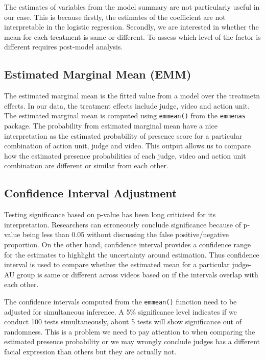 \documentclass{monashthesis}
\begin{document}
The estimates of variables from the model summary are not particularly useful in our case. This is because firstly, the estimates of the coefficient are not interpretable in the logistic regression. Secondly, we are interested in whether the mean for each treatment is same or different. To assess which level of the factor is different requires post-model analysis.

\hypertarget{estimated-marginal-mean-emm}{%
\subsection{Estimated Marginal Mean (EMM)}\label{estimated-marginal-mean-emm}}

The estimated marginal mean \autocite{gelman2006data} is the fitted value from a model over the treatmetn effects. In our data, the treatment effects include judge, video and action unit. The estimated marginal mean is computed using \texttt{emmean()} from the \texttt{emmenas} package. The probability from estimated marginal mean have a nice interpretation as the estimated probability of presence score for a particular combination of action unit, judge and video. This output allows us to compare how the estimated presence probabilities of each judge, video and action unit combination are different or similar from each other.

\hypertarget{confidence-interval-adjustment}{%
\subsection{Confidence Interval Adjustment}\label{confidence-interval-adjustment}}

Testing significance based on p-value has been long criticised for its interpretation. Researchers can erroneously conclude significance because of p-value being less than 0.05 without discussing the false positive/negative proportion. On the other hand, confidence interval provides a confidence range for the estimates to highlight the uncertainty around estimation. Thus confidence interval is used to compare whether the estimated mean for a particular judge-AU group is same or different across videos based on if the intervals overlap with each other.

The confidence intervals computed from the \texttt{emmean()} function need to be adjusted for simultaneous inference. A 5\% significance level indicates if we conduct 100 tests simultaneously, about 5 tests will show significance out of randomness. This is a problem we need to pay attention to when comparing the estimated presence probability or we may wrongly conclude judges has a different facial expression than others but they are actually not.
\end{document}
